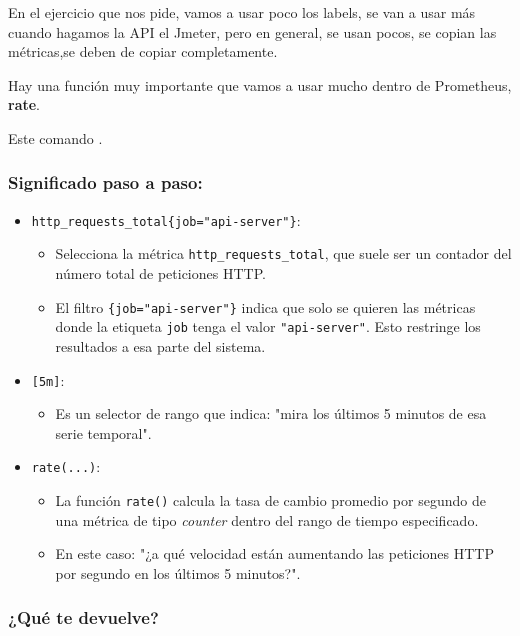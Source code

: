 En el ejercicio que nos pide, vamos a usar poco los labels, se van a usar más cuando hagamos la API el Jmeter, pero en general, se usan pocos, se copian las métricas,se deben de copiar completamente.

Hay una función muy importante que vamos a usar mucho dentro de Prometheus, \textbf{rate}.

Este comando .

\subsubsection*{Significado paso a paso:}

\begin{itemize}
  \item \texttt{http\_requests\_total\{job="api-server"\}}:
  \begin{itemize}
    \item Selecciona la métrica \texttt{http\_requests\_total}, que suele ser un contador del número total de peticiones HTTP.
    \item El filtro \texttt{\{job="api-server"\}} indica que solo se quieren las métricas donde la etiqueta \texttt{job} tenga el valor \texttt{"api-server"}. Esto restringe los resultados a esa parte del sistema.
  \end{itemize}
  \item \texttt{[5m]}:
  \begin{itemize}
    \item Es un selector de rango que indica: "mira los últimos 5 minutos de esa serie temporal".
  \end{itemize}
  \item \texttt{rate(...)}:
  \begin{itemize}
    \item La función \texttt{rate()} calcula la tasa de cambio promedio por segundo de una métrica de tipo \textit{counter} dentro del rango de tiempo especificado.
    \item En este caso: "¿a qué velocidad están aumentando las peticiones HTTP por segundo en los últimos 5 minutos?".
  \end{itemize}
\end{itemize}

\subsubsection*{ ¿Qué te devuelve?}

